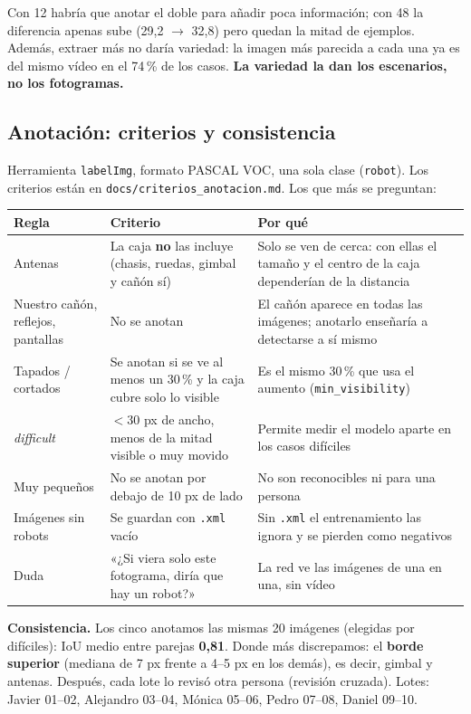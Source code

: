 \documentclass[11pt,a4paper]{article}
\newcommand{\cod}[1]{\texttt{#1}}
\begin{document}
Con 12 habría que anotar el doble para añadir poca información; con 48 la diferencia apenas sube (29,2 $\rightarrow$ 32,8) pero quedan la mitad de ejemplos. Además, extraer más no daría variedad: la imagen más parecida a cada una ya es del mismo vídeo en el 74\,\% de los casos. \textbf{La variedad la dan los escenarios, no los fotogramas.}

\subsection{Anotación: criterios y consistencia}
Herramienta \cod{labelImg}, formato PASCAL VOC, una sola clase (\cod{robot}). Los criterios están en \cod{docs/\allowbreak{}criterios\_\allowbreak{}anotacion.md}. Los que más se preguntan:

\begin{longtable}{@{}P{3.1cm}P{5.2cm}P{6.2cm}@{}}
\toprule
\textbf{Regla} & \textbf{Criterio} & \textbf{Por qué} \\
\midrule
\endhead
Antenas & La caja \textbf{no} las incluye (chasis, ruedas, gimbal y cañón sí) & Solo se ven de cerca: con ellas el tamaño y el centro de la caja dependerían de la distancia \\
Nuestro cañón, reflejos, pantallas & No se anotan & El cañón aparece en todas las imágenes; anotarlo enseñaría a detectarse a sí mismo \\
Tapados / cortados & Se anotan si se ve al menos un 30\,\% y la caja cubre solo lo visible & Es el mismo 30\,\% que usa el aumento (\cod{min\_\allowbreak{}visibility}) \\
\emph{difficult} & $<$30 px de ancho, menos de la mitad visible o muy movido & Permite medir el modelo aparte en los casos difíciles \\
Muy pequeños & No se anotan por debajo de 10 px de lado & No son reconocibles ni para una persona \\
Imágenes sin robots & Se guardan con \texttt{.xml} vacío & Sin \texttt{.xml} el entrenamiento las ignora y se pierden como negativos \\
Duda & «¿Si viera solo este fotograma, diría que hay un robot?» & La red ve las imágenes de una en una, sin vídeo \\
\bottomrule
\end{longtable}

\textbf{Consistencia.} Los cinco anotamos las mismas 20 imágenes (elegidas por difíciles): IoU medio entre parejas \textbf{0,81}. Donde más discrepamos: el \textbf{borde superior} (mediana de 7 px frente a 4--5 px en los demás), es decir, gimbal y antenas. Después, cada lote lo revisó otra persona (revisión cruzada). Lotes: Javier 01--02, Alejandro 03--04, Mónica 05--06, Pedro 07--08, Daniel 09--10.
\end{document}
